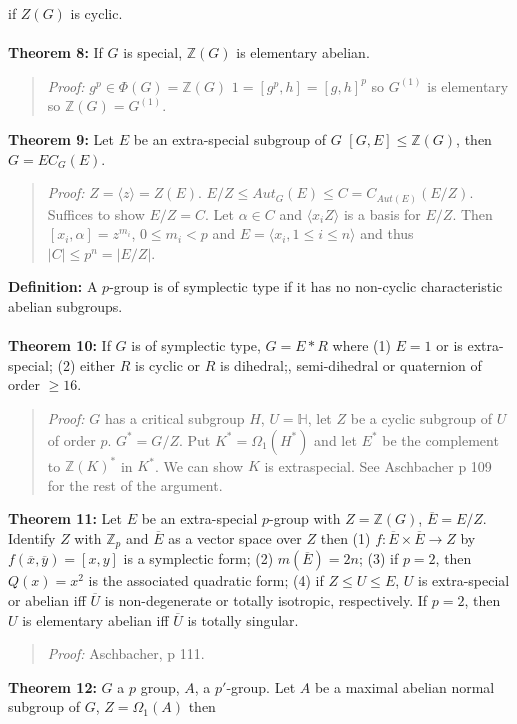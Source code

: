 if $Z(G)$ is cyclic.
\\
\\
{\bf Theorem 8:}
If $G$ is special, ${\mathbb Z}(G)$ is elementary abelian.
\begin{quote}
\emph{Proof:}
$g^p \in \Phi(G)= {\mathbb Z}(G)$ $1= [g^p,h]= [g,h]^p$ so $G^{(1)}$ is elementary
so ${\mathbb Z}(G)= G^{(1)}$.
\end{quote}
{\bf Theorem 9:}
Let $E$ be an extra-special subgroup of $G$ $[G, E] \le {\mathbb Z}(G)$, then
$G=E C_G(E)$.
\begin{quote}
\emph{Proof:}  
$Z=\langle z \rangle= Z(E)$.  $E/Z \leq Aut_G(E) \leq C= C_{Aut(E)}(E/Z)$.  Suffices to show
$E/Z=C$.  Let $\alpha \in C$ and $\langle x_iZ \rangle$ is a basis for $E/Z$.  Then $[x_i , \alpha ]= z^{m_i}$,
$0 \leq m_i <p$ and $E= \langle x_i, 1 \leq i \leq n \rangle$ and thus $|C| \leq p^n =|E/Z|$.
\end{quote}
{\bf Definition:}
A $p$-group is of symplectic type if it has no non-cyclic characteristic abelian subgroups.
\\
\\
{\bf Theorem 10:}
If $G$ is of symplectic type, $G= E*R$ where (1) $E=1$ or is extra-special;
(2) either $R$ is cyclic or $R$ is dihedral;, semi-dihedral or quaternion of order
$\ge 16$.
\begin{quote}
\emph{Proof:}  
$G$ has a critical subgroup $H$, $U= {\mathbb H}$, let $Z$ be a cyclic subgroup of $U$ of order $p$.
$G^*= G/Z$.  Put $K^* = \Omega_1(H^*)$ and let $E^*$ be the complement to ${\mathbb Z}(K)^*$ in $K^*$.
We can show $K$ is extraspecial.  See Aschbacher p 109 for the rest of the argument.
\end{quote}
{\bf Theorem 11:}
Let $E$ be an extra-special $p$-group with $Z={\mathbb Z}(G)$, ${\overline E}= E/Z$.  Identify
$Z$ with ${\mathbb Z}_p$ and ${\overline E}$ as a vector space over $Z$ then
(1) $f: {\overline E} \times {\overline E} \rightarrow Z$
by $f({\overline x}, {\overline y}) = [x, y]$ is a symplectic form;
(2) $m({\overline E})= 2n$;
(3) if $p=2$, then $Q(x)= x^2$ is the associated quadratic form;
(4) if $Z \le U \le E$,  $U$ is extra-special or abelian iff ${\overline U}$ is
non-degenerate or totally isotropic, respectively.  If $p=2$, then $U$ is elementary abelian
iff ${\overline U}$ is totally singular.
\begin{quote}
\emph{Proof:}  
Aschbacher, p 111.
\end{quote}
{\bf Theorem 12:}
$G$ a $p$ group, $A$, a $p'$-group.
Let $A$ be a maximal abelian normal subgroup of $G$, $Z= \Omega_1(A)$ then
